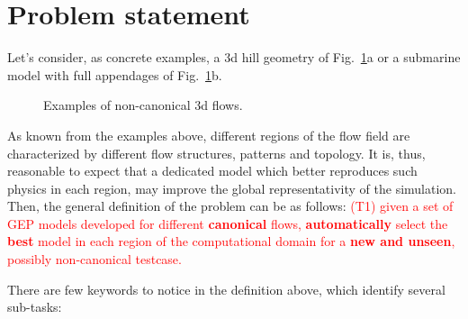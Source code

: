\section{Problem statement}
Let's consider, as concrete examples, a 3d hill geometry of Fig.~\ref{fig:examples}a or a submarine model with full appendages of Fig.~\ref{fig:examples}b.

\begin{figure}[H]%
    \centering
    \qquad
    \caption{Examples of non-canonical 3d flows.}%
    \label{fig:examples}%
\end{figure}

\noindent As known from the examples above, different regions of the flow field are characterized by different flow structures, patterns and topology. It is, thus, reasonable to expect that a dedicated model which better reproduces such physics in each region, may improve the global representativity of the simulation. Then, the general definition of the problem can be as follows:
\textcolor{red}{(T1) given a set of GEP models developed for different \textbf{canonical} flows, \textbf{automatically} select the \textbf{best} model in each region of the computational domain for a \textbf{new and unseen}, possibly non-canonical testcase.}

\vspace{10pt}
\noindent There are few keywords to notice in the definition above, which identify several sub-tasks:
